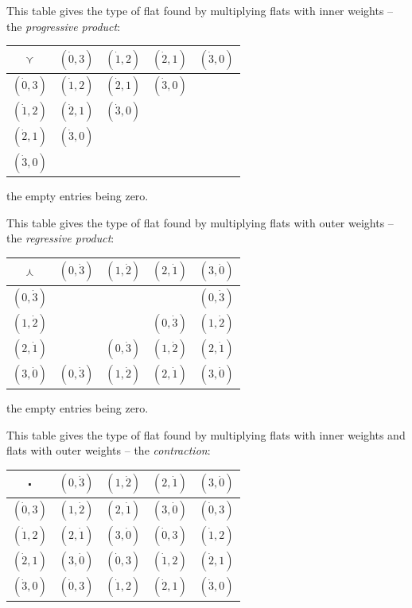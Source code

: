 \documentclass[\ifafour a4paper,12pt,\else a5paper,10pt,\fi%
onecolumn,oneside,article,%
british%
]{memoir}
\theoremstyle{remark}
\theoremstyle{innote}
\renewcommand*{\|}{\nonscript\,\vert\nonscript\;\mathopen{}}
\newcommand*{\ve}{\curlyvee}
\newcommand*{\we}{\curlywedge}
\newcommand*{\co}{\centerdot}
\newcommand*{\ywp}{\dot{0}}
\newcommand*{\ywl}{\dot{1}}
\newcommand*{\ywa}{\dot{2}}
\newcommand*{\ywv}{\dot{3}}
\begin{document}
This table gives the type of flat found by multiplying flats with inner
weights -- the \emph{progressive product}:

{\centering
  \begin{tabular}{c|cccc}
    $\ve$& $(\ywp,3)$&$(\ywl,2)$&$(\ywa,1)$&$(\ywv,0)$ \\
    \midrule
    $(\ywp,3)$&$(\ywl,2)$&$(\ywa,1)$&$(\ywv,0)$& \\
    $(\ywl,2)$&$(\ywa,1)$&$(\ywv,0)$&& \\
    $(\ywa,1)$&$(\ywv,0)$&&& \\
    $(\ywv,0)$&&&& 
  \end{tabular}

}
the empty entries being zero.

This table gives the type of flat found by multiplying flats with outer
weights -- the \emph{regressive product}:

{\centering
  \begin{tabular}{c|cccc}
    $\we$& $(0,\ywv)$&$(1,\ywa)$&$(2,\ywl)$&$(3,\ywp)$ \\
    \midrule
    $(0,\ywv)$&&&&$(0,\ywv)$ \\
    $(1,\ywa)$&&&$(0,\ywv)$&$(1,\ywa)$ \\
    $(2,\ywl)$&&$(0,\ywv)$&$(1,\ywa)$&$(2,\ywl)$ \\
    $(3,\ywp)$&$(0,\ywv)$&$(1,\ywa)$&$(2,\ywl)$&$(3,\ywp)$ \\
  \end{tabular}

}
the empty entries being zero.
        
This table gives the type of flat found by multiplying flats with inner
weights and flats with outer weights -- the \emph{contraction}:

{\centering
  \begin{tabular}{c|cccc}
    $\co$& $(0,\ywv)$&$(1,\ywa)$&$(2,\ywl)$&$(3,\ywp)$ \\
    \midrule
    $(\ywp,3)$&$(1,\ywa)$&$(2,\ywl)$&$(3,\ywp)$&$(\ywp,3)$ \\
    $(\ywl,2)$&$(2,\ywl)$&$(3,\ywp)$&$(\ywp,3)$&$(\ywl,2)$ \\
    $(\ywa,1)$&$(3,\ywp)$&$(\ywp,3)$&$(\ywl,2)$&$(\ywa,1)$ \\
    $(\ywv,0)$&$(\ywp,3)$&$(\ywl,2)$&$(\ywa,1)$&$(\ywv,0)$ \\
  \end{tabular}

}

\bigskip
\end{document}
